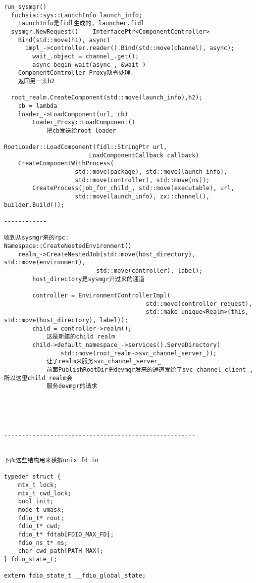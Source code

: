 \begin{verbatim}
run_sysmgr()
  fuchsia::sys::LaunchInfo launch_info;
    LaunchInfo是fidl生成的, launcher.fidl
  sysmgr.NewRequest()    InterfacePtr<ComponentController>
    Bind(std::move(h1), async)
      impl_->controller.reader().Bind(std::move(channel), async);
        wait_.object = channel_.get();
        async_begin_wait(async_, &wait_)
    ComponentController_Proxy缺省处理
    返回另一头h2

  root_realm.CreateComponent(std::move(launch_info),h2);
    cb = lambda
    loader_->LoadComponent(url, cb)
        Loader_Proxy::LoadComponent()
            把cb发送给root loader

RootLoader::LoadComponent(fidl::StringPtr url,
                        LoadComponentCallback callback)
    CreateComponentWithProcess(
                    std::move(package), std::move(launch_info),
                    std::move(controller), std::move(ns));
        CreateProcess(job_for_child_, std::move(executable), url,
                    std::move(launch_info), zx::channel(), builder.Build());

------------

收到从sysmgr来的rpc:
Namespace::CreateNestedEnvironment()
    realm_->CreateNestedJob(std::move(host_directory), std::move(environment),
                          std::move(controller), label);
        host_directory是sysmgr开过来的通道

        controller = EnvironmentControllerImpl(
                                        std::move(controller_request),
                                        std::make_unique<Realm>(this, std::move(host_directory), label));
        child = controller->realm();
            这是新建的child realm
        child->default_namespace_->services().ServeDirectory(
                std::move(root_realm->svc_channel_server_));
            让子realm来服务svc_channel_server_
            前面PublishRootDir把devmgr发来的通道发给了svc_channel_client_, 所以这里child realm会
            服务devmgr的请求





------------------------------------------------------


下面这些结构用来模拟unix fd io

typedef struct {
    mtx_t lock;
    mtx_t cwd_lock;
    bool init;
    mode_t umask;
    fdio_t* root;
    fdio_t* cwd;
    fdio_t* fdtab[FDIO_MAX_FD];
    fdio_ns_t* ns;
    char cwd_path[PATH_MAX];
} fdio_state_t;

extern fdio_state_t __fdio_global_state;


\end{verbatim}
